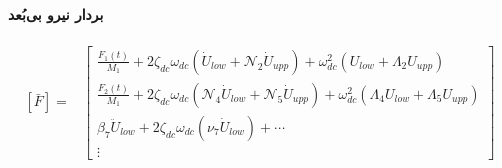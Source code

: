 \paragraph{بردار نیرو بی‌بُعد}
\begin{equation}\label{Eq.force_vector_dimensionless}
\begin{aligned}
[\bar{F}] = & \begin{bmatrix}
\tfrac{F_1(t)}{M_1} + 2 \zeta_{dc} \omega_{dc} (\dot{U}_{low} + \mathcal{N}_2 \dot{U}_{upp}) + \omega_{dc}^2 (U_{low} + \Lambda_2 U_{upp})\\
\tfrac{F_2(t)}{M_1} + 2 \zeta_{dc} \omega_{dc} (\mathcal{N}_4 \dot{U}_{low} + \mathcal{N}_5 \dot{U}_{upp}) + \omega_{dc}^2 (\Lambda_4 U_{low} + \Lambda_5 U_{upp}) \\
\beta_7 \ddot{U}_{low} +  2 \zeta_{dc} \omega_{dc} (\nu_7 \dot{U}_{low}) +\cdots\\
\vdots
\end{bmatrix}
\end{aligned}
\end{equation}

